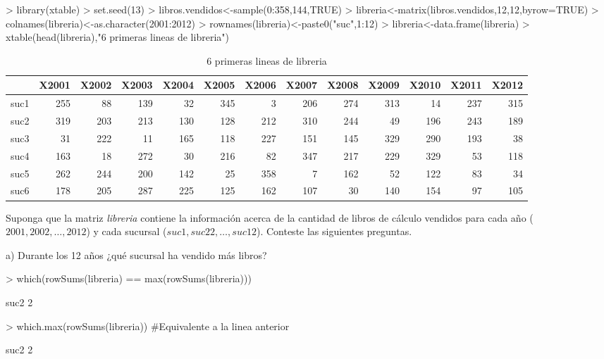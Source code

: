 \documentclass{article}
\begin{document}
\begin{Schunk}
\begin{Sinput}
> library(xtable)
> set.seed(13)
> libros.vendidos<-sample(0:358,144,TRUE)
> libreria<-matrix(libros.vendidos,12,12,byrow=TRUE)
> colnames(libreria)<-as.character(2001:2012)
> rownames(libreria)<-paste0("suc",1:12)
> libreria<-data.frame(libreria)
> xtable(head(libreria),"6 primeras lineas de libreria")
\end{Sinput}
% latex table generated in R 3.4.0 by xtable 1.8-2 package
% Sat Jun 24 00:10:04 2017
\begin{table}[ht]
\centering
\begin{tabular}{rrrrrrrrrrrrr}
  \hline
 & X2001 & X2002 & X2003 & X2004 & X2005 & X2006 & X2007 & X2008 & X2009 & X2010 & X2011 & X2012 \\ 
  \hline
suc1 & 255 &  88 & 139 &  32 & 345 &   3 & 206 & 274 & 313 &  14 & 237 & 315 \\ 
  suc2 & 319 & 203 & 213 & 130 & 128 & 212 & 310 & 244 &  49 & 196 & 243 & 189 \\ 
  suc3 &  31 & 222 &  11 & 165 & 118 & 227 & 151 & 145 & 329 & 290 & 193 &  38 \\ 
  suc4 & 163 &  18 & 272 &  30 & 216 &  82 & 347 & 217 & 229 & 329 &  53 & 118 \\ 
  suc5 & 262 & 244 & 200 & 142 &  25 & 358 &   7 & 162 &  52 & 122 &  83 &  34 \\ 
  suc6 & 178 & 205 & 287 & 225 & 125 & 162 & 107 &  30 & 140 & 154 &  97 & 105 \\ 
   \hline
\end{tabular}
\caption{6 primeras lineas de libreria} 
\end{table}\end{Schunk}

Suponga que la matriz \emph{libreria} contiene la información acerca de la cantidad de libros de cálculo vendidos para cada año ($2001,2002,\hdots, 2012$) y cada sucursal ($suc1,suc22,\hdots, suc12$). Conteste las siguientes preguntas.

a) Durante los 12 años ¿qué sucursal ha vendido más libros?

\begin{Schunk}
\begin{Sinput}
> which(rowSums(libreria) == max(rowSums(libreria)))
\end{Sinput}
\begin{Soutput}
suc2 
   2 
\end{Soutput}
\begin{Sinput}
> which.max(rowSums(libreria)) #Equivalente a la linea anterior
\end{Sinput}
\begin{Soutput}
suc2 
   2 
\end{Soutput}
\end{Schunk}
\end{document}
